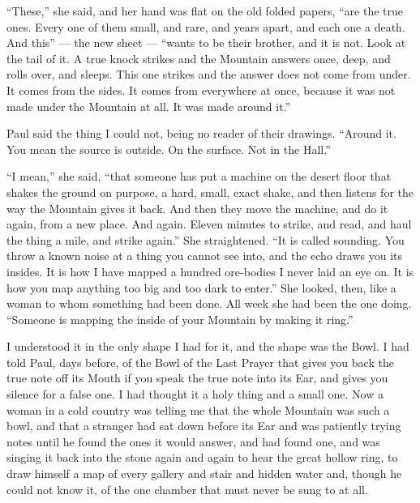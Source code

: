``These,'' she said, and her hand was flat on the old folded papers, ``are the true ones. Every one of them small, and rare, and years apart, and each one a death. And this'' --- the new sheet --- ``wants to be their brother, and it is not. Look at the tail of it. A true knock strikes and the Mountain answers once, deep, and rolls over, and sleeps. This one strikes and the answer does not come from under. It comes from the sides. It comes from everywhere at once, because it was not made under the Mountain at all. It was made around it.''\par

Paul said the thing I could not, being no reader of their drawings. ``Around it. You mean the source is outside. On the surface. Not in the Hall.''\par

``I mean,'' she said, ``that someone has put a machine on the desert floor that shakes the ground on purpose, a hard, small, exact shake, and then listens for the way the Mountain gives it back. And then they move the machine, and do it again, from a new place. And again. Eleven minutes to strike, and read, and haul the thing a mile, and strike again.'' She straightened. ``It is called sounding. You throw a known noise at a thing you cannot see into, and the echo draws you its insides. It is how I have mapped a hundred ore-bodies I never laid an eye on. It is how you map anything too big and too dark to enter.'' She looked, then, like a woman to whom something had been done. All week she had been the one doing. ``Someone is mapping the inside of your Mountain by making it ring.''\par

I understood it in the only shape I had for it, and the shape was the Bowl. I had told Paul, days before, of the Bowl of the Last Prayer that gives you back the true note off its Mouth if you speak the true note into its Ear, and gives you silence for a false one. I had thought it a holy thing and a small one. Now a woman in a cold country was telling me that the whole Mountain was such a bowl, and that a stranger had sat down before its Ear and was patiently trying notes until he found the ones it would answer, and had found one, and was singing it back into the stone again and again to hear the great hollow ring, to draw himself a map of every gallery and stair and hidden water and, though he could not know it, of the one chamber that must never be sung to at all.\par

